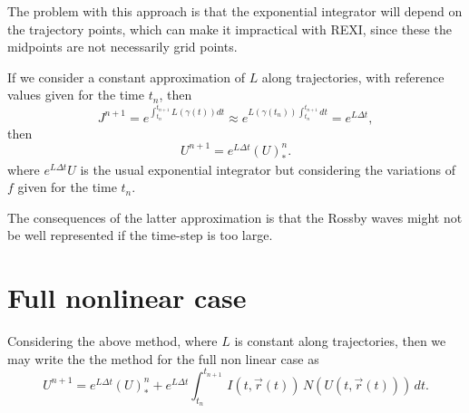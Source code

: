 \documentclass[10pt,a4paper]{article}
\begin{document}
The problem with this approach is that the exponential integrator will depend on the trajectory points, which can make it impractical with REXI, since these the midpoints are not necessarily grid points. 

If we consider a constant approximation of $L$ along trajectories, with reference values given for the time $t_n$, then 
\begin{equation}
J^{n+1}=e^{\int_{t_n}^{t_{n+1}}L(\gamma(t))dt} \approx e^{L(\gamma(t_n))\int_{t_n}^{t_{n+1}}dt} = e^{L \Delta t},
\end{equation}
then
\begin{equation}
U^{n+1}=e^{L \Delta t}( U)^{n}_{*}.
\end{equation}
where $e^{L \Delta t} U$ is the usual exponential integrator but considering the variations of $f$ given for the time $t_n$. 

The consequences of the latter approximation is that the Rossby waves might not be well represented if the time-step is too large.






\section{Full nonlinear case}

Considering the above method, where $L$ is constant along trajectories, then we may write the the method for the full non linear case as 
\begin{equation}
U^{n+1}=e^{L \Delta t}( U)^{n}_{*}+e^{L\Delta t}\int_{t_n}^{t_{n+1}} \, I(t, \vec{r}(t))\, N(U(t, \vec{r}(t)))\,dt.
\end{equation}
\end{document}
